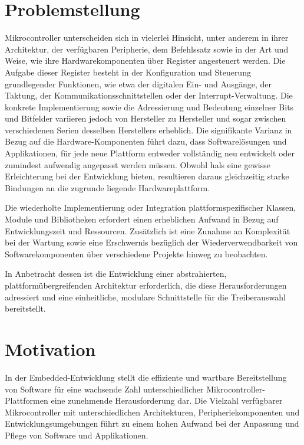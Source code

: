 \section{Problemstellung}
Mikrocontroller unterscheiden sich in vielerlei Hinsicht, unter anderem in ihrer Architektur, der verfügbaren Peripherie, dem Befehlssatz sowie in der Art und Weise, wie ihre Hardwarekomponenten über Register angesteuert werden.
Die Aufgabe dieser Register besteht in der Konfiguration und Steuerung grundlegender Funktionen, wie etwa der digitalen Ein- und Ausgänge, der Taktung, der Kommunikationsschnittstellen oder der Interrupt-Verwaltung.
Die konkrete Implementierung sowie die Adressierung und Bedeutung einzelner Bits und Bitfelder variieren jedoch von Hersteller zu Hersteller und sogar zwischen verschiedenen Serien desselben Herstellers erheblich.
Die signifikante Varianz in Bezug auf die Hardware-Komponenten führt dazu, dass Softwarelösungen und Applikationen, für jede neue Plattform entweder vollständig neu entwickelt oder zumindest aufwendig angepasst werden müssen.
Obwohl \gls{hals} eine gewisse Erleichterung bei der Entwicklung bieten, resultieren daraus gleichzeitig starke Bindungen an die zugrunde liegende Hardwareplattform.

Die wiederholte Implementierung oder Integration plattformspezifischer Klassen, Module und Bibliotheken erfordert einen erheblichen Aufwand in Bezug auf Entwicklungszeit und Ressourcen.
Zusätzlich ist eine Zunahme an Komplexität bei der Wartung sowie eine Erschwernis bezüglich der Wiederverwendbarkeit von Softwarekomponenten über verschiedene Projekte hinweg zu beobachten.

 In Anbetracht dessen ist die Entwicklung einer abstrahierten, plattformübergreifenden Architektur erforderlich, die diese Herausforderungen adressiert und eine einheitliche, modulare Schnittstelle für die Treiberauswahl bereitstellt.



\section{Motivation}
In der Embedded-Entwicklung stellt die effiziente und wartbare Bereitstellung von Software für eine wachsende Zahl unterschiedlicher Mikrocontroller-Plattformen eine zunehmende Herausforderung dar.
Die Vielzahl verfügbarer Mikrocontroller mit unterschiedlichen Architekturen, Peripheriekomponenten und Entwicklungsumgebungen führt zu einem hohen Aufwand bei der Anpassung und Pflege von Software und Applikationen.

